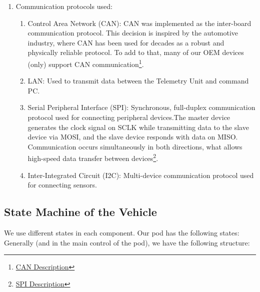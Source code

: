 \begin{enumerate}
    \item Communication protocols used: 
\begin{enumerate}
    \item Control Area Network (CAN): CAN was implemented as the inter-board communication protocol. This decision is inspired by the automotive industry, where CAN has been used for decades as a robust and physically reliable protocol.
    To add to that, many of our OEM devices (only) support CAN communication\footnote{\href{https://www.ti.com/lit/an/sloa101b/sloa101b.pdf}{CAN Description}}.
    \item LAN: Used to transmit data between the Telemetry Unit and command PC.
    \item Serial Peripheral Interface (SPI): Synchronous, full-duplex communication protocol used for connecting peripheral devices.The master device generates the clock signal on SCLK while transmitting data to the slave device via MOSI, and the slave device responds with data on MISO. Communication occurs simultaneously in both directions, what allows high-speed data transfer between devices\footnote{\href{https://www.ti.com/lit/ug/sprugp2a/sprugp2a.pdf?ts=1710046776474\&ref\_url=https\%253A\%252F\%252Fwww.google.com\%252F}{SPI Description}}.


    \item Inter-Integrated Circuit (I2C): Multi-device communication protocol used for connecting sensors.
\end{enumerate}

\end{enumerate}


\subsection{State Machine of the Vehicle}

We use different states in each component. Our pod has the following states:
Generally (and in the main control of the pod), we have the following structure:

